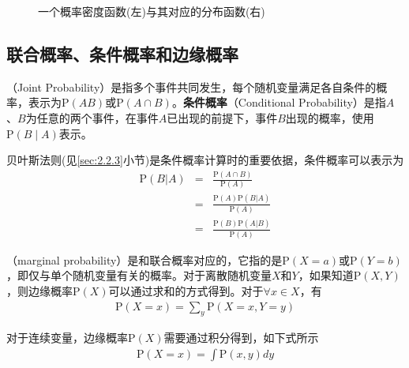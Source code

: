 \begin{figure}[htp]
\centering
 
\caption{一个概率密度函数(左)与其对应的分布函数(右)}
\label{fig:2-3}
\end{figure}


\subsection{联合概率、条件概率和边缘概率}
（Joint Probability）是指多个事件共同发生，每个随机变量满足各自条件的概率，表示为$\textrm{P}(AB)$或$\textrm{P}(A\cap{B})$。{\small\sffamily\bfseries{条件概率}}（Conditional Probability）是指$A$、$B$为任意的两个事件，在事件$A$已出现的前提下，事件$B$出现的概率，使用$\textrm{P}(B \mid A)$表示。

\parinterval 贝叶斯法则(见\ref{sec:2.2.3}小节)是条件概率计算时的重要依据，条件概率可以表示为
\begin{eqnarray}
\textrm{P}{(B|A)} & = & \frac{\textrm{P}(A\cap{B})}{\textrm{P}(A)}  \nonumber \\
                           & = & \frac{\textrm{P}(A)\textrm{P}(B|A)}{\textrm{P}(A)}  \nonumber \\
                           & = & \frac{\textrm{P}(B)\textrm{P}(A|B)}{\textrm{P}(A)}
\label{eq:2-2}
\end{eqnarray}

（marginal probability）是和联合概率对应的，它指的是$\textrm{P}(X=a)$或$\textrm{P}(Y=b)$，即仅与单个随机变量有关的概率。对于离散随机变量$X$和$Y$，如果知道$\textrm{P}(X,Y)$，则边缘概率$\textrm{P}(X)$可以通过求和的方式得到。对于$\forall x \in X $，有
\begin{eqnarray}
\textrm{P}(X=x)=\sum_{y}  \textrm{P}(X=x,Y=y)
\label{eq:2-3}
\end{eqnarray}

\parinterval 对于连续变量，边缘概率$\textrm{P}(X)$需要通过积分得到，如下式所示
\begin{eqnarray}
\textrm{P}(X=x)=\int \textrm{P}(x,y)dy
\label{eq:2-4}
\end{eqnarray}

